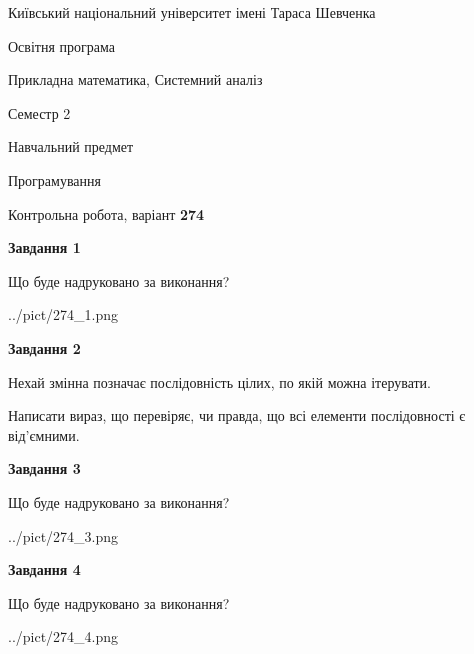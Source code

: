 \documentclass[12pt, ukrainian]{article}
\begin{document}
{{\begin {small}\par
{ \center  Київський національний університет імені Тараса Шевченка \par}
{\parbox {5 cm}{Освітня програма \hfill}{\parbox {8 cm}{Прикладна математика, Системний аналіз \hfill}}\parbox {5 cm}{\hfill Семестр 2}}\par
{\parbox {5 cm} {Навчальний предмет \hfill}\parbox {7 cm}{Програмування \hfill}\parbox {6cm}{\hfill}\par}\vspace{-7pt} \end{small}}{\center Контрольна робота, варіант  \No \textbf
{ 274 }\par}}
{
\begin {large}
{\begin {center}\textbf{Завдання 1}\end {center}}\par
Що буде надруковано за виконання?\par\par
\begin{center}
	{../pict/274_1.png}
\end{center}
\newpage

{\begin {center}\textbf{Завдання 2}\end {center}}\par
Нехай змінна  позначає послідовність цілих, по якій можна ітерувати.

Написати вираз, що перевіряє, чи правда, що всі елементи послідовності є від’ємни\-ми.\par
\newpage

{\begin {center}\textbf{Завдання 3}\end {center}}\par
Що буде надруковано за виконання?
\begin{center}
	{../pict/274_3.png}
\end{center}
\newpage

{\begin {center}\textbf{Завдання 4}\end {center}}\par
Що буде надруковано за виконання?\par
\begin{center}
	{../pict/274_4.png}
\end{center}
\newpage


\end{large}}
\end{document}
